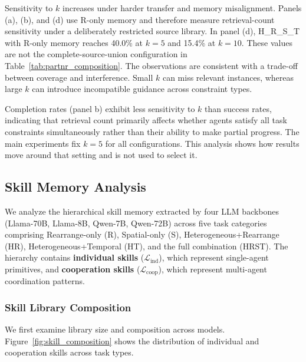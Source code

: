 \documentclass{article}
\theoremstyle{plain}
\theoremstyle{definition}
\theoremstyle{remark}
\begin{document}
Sensitivity to $k$ increases under harder transfer and memory misalignment. Panels (a), (b), and (d) use R-only memory and therefore measure retrieval-count sensitivity under a deliberately restricted source library. In panel (d), H\_R\_S\_T with R-only memory reaches 40.0\% at $k{=}5$ and 15.4\% at $k{=}10$. These values are not the complete-source-union configuration in Table~\ref{tab:partnr_composition}. The observations are consistent with a trade-off between coverage and interference. Small $k$ can miss relevant instances, whereas large $k$ can introduce incompatible guidance across constraint types.

Completion rates (panel b) exhibit less sensitivity to $k$ than success rates, indicating that retrieval count primarily affects whether agents satisfy all task constraints simultaneously rather than their ability to make partial progress. The main experiments fix $k=5$ for all configurations. This analysis shows how results move around that setting and is not used to select it.


\subsection{Skill Memory Analysis}
\label{sec:skill_memory_analysis}

We analyze the hierarchical skill memory extracted by four LLM backbones (Llama-70B, Llama-8B, Qwen-7B, Qwen-72B) across five task categories comprising Rearrange-only (R), Spatial-only (S), Heterogeneous+Rearrange (HR), Heterogeneous+Temporal (HT), and the full combination (HRST). The hierarchy contains \textbf{individual skills} ($\mathcal{L}_{\text{ind}}$), which represent single-agent primitives, and \textbf{cooperation skills} ($\mathcal{L}_{\text{coop}}$), which represent multi-agent coordination patterns.

\subsubsection{Skill Library Composition}
\label{subsec:skill_composition}

We first examine library size and composition across models. Figure~\ref{fig:skill_composition} shows the distribution of individual and cooperation skills across task types.
\end{document}
